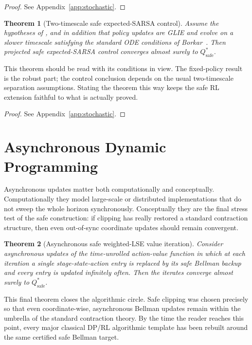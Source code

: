 \documentclass{article}
\newtheorem{theorem}{Theorem}[section]
\theoremstyle{remark}
\newcommand{\safe}{\mathrm{safe}}
\begin{document}
\begin{proof}
See Appendix~\ref{app:stochastic}.
\end{proof}

\begin{theorem}[Two-timescale safe expected-SARSA control]
\label{thm:sarsa-convergence}
Assume the hypotheses of , and in addition that policy updates are GLIE and evolve on a slower timescale satisfying the standard ODE conditions of Borkar~\cite{borkar2000ode}.
Then projected safe expected-SARSA control converges almost surely to $Q_\safe^*$.
\end{theorem}

This theorem should be read with its conditions in view.
The fixed-policy result is the robust part; the control conclusion depends on the usual two-timescale separation assumptions.
Stating the theorem this way keeps the safe RL extension faithful to what is actually proved.

\begin{proof}
See Appendix~\ref{app:stochastic}.
\end{proof}

\section{Asynchronous Dynamic Programming}
\label{sec:async}

Asynchronous updates matter both computationally and conceptually.
Computationally they model large-scale or distributed implementations that do not sweep the whole horizon synchronously.
Conceptually they are the final stress test of the safe construction: if clipping has really restored a standard contraction structure, then even out-of-sync coordinate updates should remain convergent.

\begin{theorem}[Asynchronous safe weighted-LSE value iteration]
\label{thm:async-vi}
Consider asynchronous updates of the time-unrolled action-value function in which at each iteration a single stage-state-action entry is replaced by its safe Bellman backup and every entry is updated infinitely often.
Then the iterates converge almost surely to $Q_\safe^*$.
\end{theorem}

This final theorem closes the algorithmic circle.
Safe clipping was chosen precisely so that even coordinate-wise, asynchronous Bellman updates remain within the umbrella of the standard contraction theory.
By the time the reader reaches this point, every major classical DP/RL algorithmic template has been rebuilt around the same certified safe Bellman target.
\end{document}
